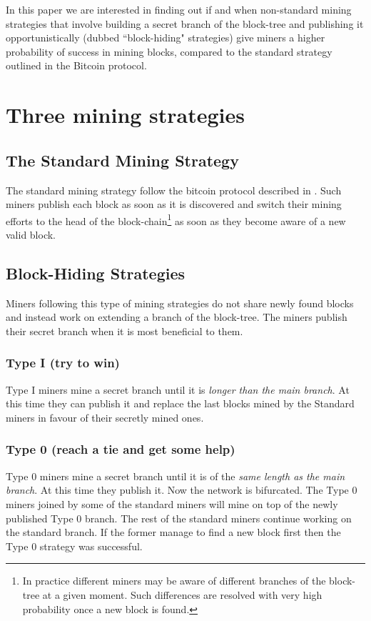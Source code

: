 \documentclass[letterpaper,12pt]{report}
\begin{document}
In this paper we are interested in finding out if and when non-standard mining strategies that involve building a secret branch of the block-tree and publishing it opportunistically (dubbed ``block-hiding" strategies) give miners a higher probability of success in mining blocks, compared to the standard strategy outlined in the Bitcoin protocol.

\chapter{Three mining strategies}\label{chap:strategies}

\section{The Standard Mining Strategy}
The standard mining strategy follow the bitcoin protocol described in \cite{Bitcoin}. Such miners publish each block as soon as it is discovered and switch their mining efforts to the head of the block-chain\footnote{In practice different miners may be aware of different branches of the block-tree at a given moment. Such differences are resolved with very high probability once a new block is found.} as soon as they become aware of a new valid block.



\section{Block-Hiding Strategies}
Miners following this type of mining strategies do not share newly found blocks and instead work on extending a  branch of the block-tree. The miners publish their secret branch when it is most beneficial to them. 



\subsection{Type I (try to win)}
Type I miners mine a secret branch until it is \textit{longer than the main branch}. At this time they can publish it and replace the last  blocks mined by the Standard miners in favour of their  secretly mined ones.

\subsection{Type 0 (reach a tie and get some help)}
Type 0 miners mine a secret branch until it is of the  \textit{same length as the main branch}. At this time they publish it. Now the network is bifurcated. The Type 0 miners joined by some of the standard miners will mine on top of the newly published Type 0 branch. The rest of the standard miners continue working on the standard branch. If the former manage to find a new block first then the Type 0 strategy was successful. 
\end{document}
